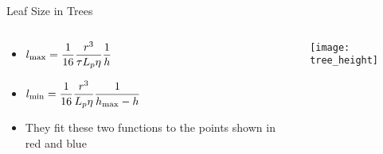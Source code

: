 \documentclass[10pt]{beamer}
\newcommand{\tn}{\textnormal}
\begin{document}
\begin{frame}{Leaf Size in Trees}
  \begin{columns}
    \begin{column}{.49\textwidth}
      \begin{itemize}
      \item
        $\displaystyle{l_\tn{max} = \frac{1}{16} \frac{r^3}{\tau L_p
            \eta} \frac{1}{h}}$
      \item
        $\displaystyle{l_\tn{min} = \frac{1}{16} \frac{r^3}{L_p \eta}
          \frac{1}{h_\tn{max} - h}}$
      \item They fit these two functions to the points shown in red
        and blue
      \end{itemize}
    \end{column}
    
    \begin{column}{.49\textwidth}
      \vfill
      \texttt{[image: tree\_height]}
      \vfill
    \end{column}
  \end{columns}
\end{frame}



\end{document}
